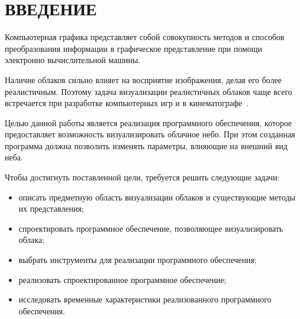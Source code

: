 \chapter*{ВВЕДЕНИЕ}

Компьютерная графика представляет собой совокупность методов
и способов преобразования информации в графическое представление при
помощи электронно вычислительной машины.

Наличие облаков сильно влияет на восприятие изображения, делая его более реалистичным. Поэтому задача визуализации реалистичных облаков чаще всего встречается при разработке компьютерных игр и в кинематографе~\cite{oz, hzd, frostbite}. 

Целью данной работы является реализация программного обеспечения, которое предоставляет возможность визуализировать облачное небо. При этом созданная программа должна позволить изменять параметры, влияющие на внешний вид неба.

Чтобы достигнуть поставленной цели, требуется решить следующие задачи:

\begin{itemize}
	\item описать предметную область визуализации облаков и существующие методы их представления;
	\item спроектировать программное обеспечение, позволяющее визуализировать облака;
	\item выбрать инструменты для реализации программного обеспечения;
	\item реализовать спроектированное программное обеспечение;
	\item исследовать временные характеристики реализованного программного обеспечения.
\end{itemize}